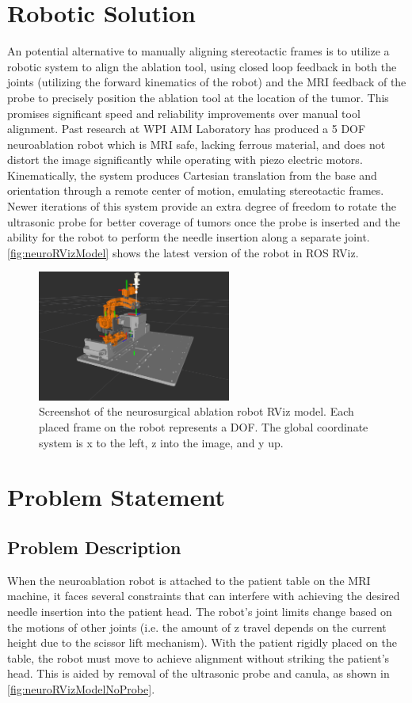 \documentclass[12pt]{report}
\begin{document}
\section{Robotic Solution}
An potential alternative to manually aligning stereotactic frames is to utilize a robotic system to align the ablation tool, using closed loop feedback in both the joints (utilizing the forward kinematics of the robot) and the MRI feedback of the probe to precisely position the ablation tool at the location of the tumor. This promises significant speed and reliability improvements over manual tool alignment. Past research at WPI AIM Laboratory has produced a 5 DOF neuroablation robot which is MRI safe, lacking ferrous material, and does not distort the image significantly while operating with piezo electric motors. \cite{aimLabRobot} Kinematically, the system produces Cartesian translation from the base and orientation through a remote center of motion, emulating stereotactic frames. Newer iterations of this system provide an extra degree of freedom to rotate the ultrasonic probe for better coverage of tumors once the probe is inserted and the ability for the robot to perform the needle insertion along a separate joint. \autoref{fig:neuroRVizModel} shows the latest version of the robot in ROS RViz.

\begin{figure}[thpb]
	\centering
	\includegraphics[width = 2.5in]{images/neuro_rviz_model.png}
    \caption{Screenshot of the neurosurgical ablation robot RViz model. Each placed frame on the robot represents a DOF. The global coordinate system is x to the left, z into the image, and y up. }
    \label{fig:neuroRVizModel}
\end{figure}

\section{Problem Statement}

\subsection{Problem Description}
When the neuroablation robot is attached to the patient table on the MRI machine, it faces several constraints that can interfere with achieving the desired needle insertion into the patient head. The robot's joint limits change based on the motions of other joints (i.e. the amount of z travel depends on the current height due to the scissor lift mechanism). With the patient rigidly placed on the table, the robot must move to achieve alignment without striking the patient's head. This is aided by removal of the ultrasonic probe and canula, as shown in \autoref{fig:neuroRVizModelNoProbe}. 
\end{document}
